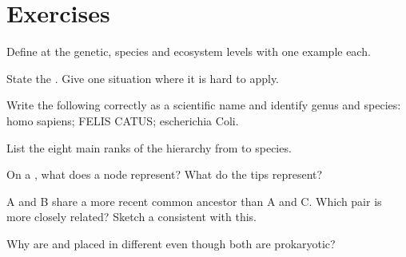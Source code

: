 \section{Exercises}

\begin{exercise}[$\star$]\label{exo:g10:biodiversity-classification:1}
Define  at the genetic, species and ecosystem levels with one
example each.
\end{exercise}

\begin{exercise}[$\star$]\label{exo:g10:biodiversity-classification:2}
State the . Give one situation where it is hard
to apply.
\end{exercise}

\begin{exercise}[$\star$]\label{exo:g10:biodiversity-classification:3}
Write the following correctly as a scientific name and identify genus
and species: homo sapiens; FELIS CATUS; escherichia Coli.
\end{exercise}

\begin{exercise}[$\star$]\label{exo:g10:biodiversity-classification:4}
List the eight main ranks of the hierarchy from  to species.
\end{exercise}

\begin{exercise}[$\star$]\label{exo:g10:biodiversity-classification:5}
On a , what does a node represent? What do the tips represent?
\end{exercise}

\begin{exercise}[$\star\star$]\label{exo:g10:biodiversity-classification:6}
 A and B share a more recent common ancestor than A and C. Which
pair is more closely related? Sketch a  consistent with this.
\end{exercise}

\begin{exercise}[$\star\star$]\label{exo:g10:biodiversity-classification:7}
Why are  and  placed in different  even though both
are prokaryotic?
\end{exercise}

